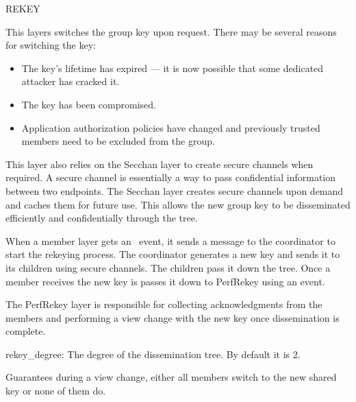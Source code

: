%
%
%
\begin{Layer}{REKEY}

This layers switches the group key upon request. There may be several 
reasons for switching the key:
\begin{itemize}
\item The key's lifetime has expired --- it is now possible that some
dedicated attacker has cracked it.
\item The key has been compromised. 
\item Application authorization policies have changed and previously trusted
members need to be excluded from the group. 
\end{itemize}

This layer also relies on the Secchan layer to create secure
channels when required. A secure channel is essentially a way
to pass confidential information between two endpoints. The Secchan
layer creates secure channels upon demand and caches them for future
use. This allows the new group key to be disseminated efficiently and
confidentially through the tree. 

\begin{Protocol}
When a member layer gets an \ERekeyPrcl\ event, it sends a message to the
coordinator to start the rekeying process.  The coordinator generates
a new key and sends it to its children using secure channels. The
children pass it down the tree. Once a member receives the new key is
passes it down to PerfRekey using an  event.

The PerfRekey layer is responsible for collecting acknowledgments from the
members and performing a view change with the new key once
dissemination is complete. 
\end{Protocol}

\begin{Parameters}
\item {rekey\_degree:} The degree of the dissemination tree. By
default it is 2.
\end{Parameters}

\begin{Properties}
\item
Guarantees during a view change, either all members switch to the new
shared key or none of them do.
\end{Properties}


\end{Layer}
